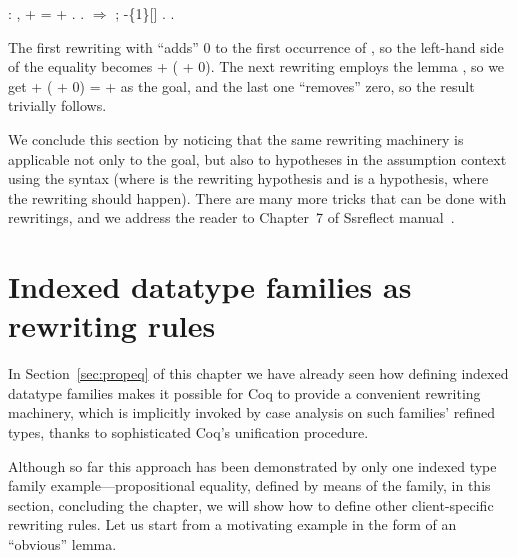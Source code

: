 \begin{coqdoccode}
\coqdocemptyline
\coqdocnoindent
{} : \coqdockw{\ensuremath{\forall}}  ,  +  =  + .\coqdoceol
\coqdocnoindent
{}.\coqdoceol
\coqdocnoindent
{} \ensuremath{\Rightarrow}  ;  -\{1\}[]  .\coqdoceol
\coqdocnoindent
{}.\coqdoceol
\coqdocemptyline
\end{coqdoccode}


The first rewriting with  ``adds'' 0 to the first occurrence of
, so the left-hand side of the equality becomes  + ( +
0). The next rewriting employs the lemma , so we get  + (
+ 0) =  +  as the goal, and the last one ``removes'' zero, so the
result trivially follows.


We conclude this section by noticing that the same rewriting machinery
is applicable not only to the goal, but also to hypotheses in the
assumption context using the     syntax (where  is
the rewriting hypothesis and  is a hypothesis, where the rewriting
should happen). There are many more tricks that can be done with
rewritings, and we address the reader to Chapter~7 of Ssreflect
manual~\cite{Gontier-al:TR}.




\section{Indexed datatype families as rewriting rules}


\label{sec:indexed}


In Section~\ref{sec:propeq} of this chapter we have already seen how
defining indexed datatype families 
makes it possible for Coq to provide a convenient rewriting machinery,
which is implicitly invoked by case analysis on such families' refined
types, thanks to sophisticated Coq's unification procedure.


Although so far this approach has been demonstrated by only one
indexed type family example---propositional equality, defined by means
of the  family, in this section, concluding the chapter, we will
show how to define other client-specific rewriting rules. Let us start
from a motivating example in the form of an ``obvious'' lemma.


